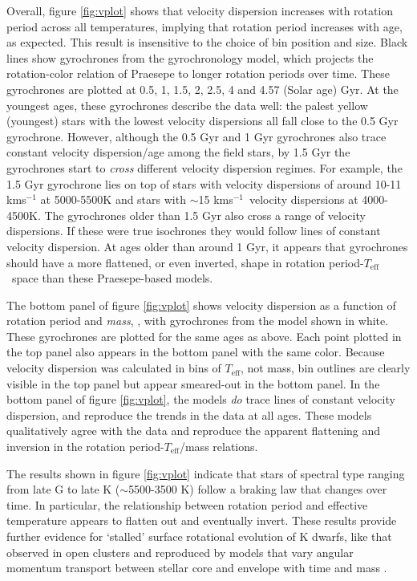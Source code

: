 \documentclass{aastex63}
\newcommand{\teff}{$T_{\mathrm{eff}}$}
\newcommand{\kms}{kms$^{-1}$}
\newcommand{\racomment}[1]{{\color{blue}#1}}
\begin{document}
Overall, figure \ref{fig:vplot} shows that velocity dispersion increases with
rotation period across all temperatures, implying that rotation period
increases with age, as expected.
This result is insensitive to the choice of bin position and size.
Black lines show gyrochrones from the \citet{angus2019} gyrochronology model,
which projects the rotation-color relation of Praesepe to longer rotation
periods over time.
These gyrochrones are plotted at 0.5, 1, 1.5, 2, 2.5, 4 and 4.57 (Solar age)
Gyr.
At the youngest ages, these gyrochrones describe the data well: the palest
yellow (youngest) stars with the lowest velocity dispersions all fall close to
the 0.5 Gyr gyrochrone.
However, although the 0.5 Gyr and 1 Gyr gyrochrones also trace constant
velocity dispersion/age among the field stars, by 1.5 Gyr the gyrochrones
start to {\it cross} different velocity dispersion regimes.
For example, the 1.5 Gyr gyrochrone lies on top of stars with velocity
dispersions of around 10-11 kms$^{-1}$ at 5000-5500K and stars with $\sim$15
\kms\ velocity dispersions at 4000-4500K.
The gyrochrones older than 1.5 Gyr also cross a range of velocity dispersions.
If these were true isochrones they would follow lines of constant velocity
dispersion.
At ages older than around 1 Gyr, it appears that gyrochrones should have a
more flattened, or even inverted, shape in rotation period-\teff\ space than
these Praesepe-based models.

The bottom panel of figure \ref{fig:vplot} shows velocity dispersion as a
function of rotation period and {\it mass}, \citep[from][]{berger2020}, with
gyrochrones from the \citet{spada2019} model shown in white.
These gyrochrones are \racomment{plotted for the same ages as above.}
Each point plotted in the top panel also appears in the bottom panel with the
same color.
Because velocity dispersion was calculated in bins of \teff, not mass, bin
outlines are clearly visible in the top panel but appear smeared-out in the
bottom panel.
In the bottom panel of figure \ref{fig:vplot}, the \citet{spada2019} models
{\it do} trace lines of constant velocity dispersion, and reproduce the trends
in the data at all ages.
These models qualitatively agree with the data and reproduce the apparent
flattening and inversion in the rotation period-\teff/mass relations.

The results shown in figure \ref{fig:vplot} indicate that stars of spectral
type ranging from late G to late K ($\sim$5500-3500 K) follow a braking law
that changes over time.
In particular, the relationship between rotation period and effective
temperature appears to flatten out and eventually invert.
These results provide further evidence for `stalled' surface rotational
evolution of K dwarfs, like that observed in open clusters \citep{curtis2019}
and reproduced by models that vary angular momentum transport between stellar
core and envelope with time and mass \citep{spada2019}.
\end{document}

